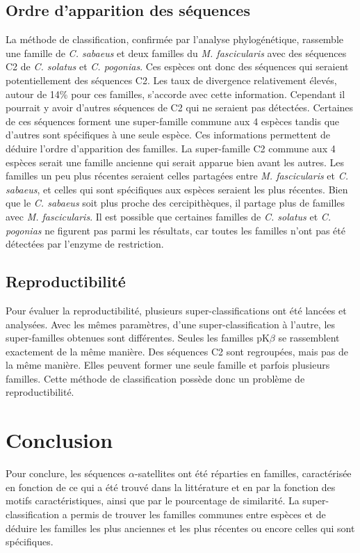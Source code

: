 \documentclass[12pt,a4paper]{article}
\begin{document}
	\subsection{Ordre d'apparition des séquences}
	La méthode de classification, confirmée par l'analyse phylogénétique, rassemble une famille de \textit{C. sabaeus} et deux familles du \textit{M. fascicularis} avec des séquences C2 de \textit{C. solatus} et \textit{C. pogonias}. Ces espèces ont donc des séquences qui seraient potentiellement des séquences C2. Les taux de divergence relativement élevés, autour de 14\% pour ces familles, s'accorde avec cette information. Cependant il pourrait y avoir d'autres séquences de C2 qui ne seraient pas détectées. Certaines de ces séquences forment une super-famille commune aux 4 espèces tandis que d'autres sont spécifiques à une seule espèce. Ces informations permettent de déduire l'ordre d'apparition des familles. La super-famille C2 commune aux 4 espèces serait une famille ancienne qui serait apparue bien avant les autres. Les familles un peu plus récentes seraient celles partagées entre \textit{M. fascicularis} et \textit{C. sabaeus}, et celles qui sont spécifiques aux espèces seraient les plus récentes. Bien que le \textit{C. sabaeus} soit plus proche des cercipithèques, il partage plus de familles avec \textit{M. fascicularis}. Il est possible que certaines familles de \textit{C. solatus} et \textit{C. pogonias} ne figurent pas parmi les résultats, car toutes les familles n'ont pas été détectées par l'enzyme de restriction. 
	\subsection{Reproductibilité}
	Pour évaluer la reproductibilité,  plusieurs super-classifications ont été lancées et analysées. Avec les mêmes paramètres, d'une super-classification à l'autre, les super-familles obtenues sont différentes. Seules les familles pK$\beta$ se rassemblent exactement de la même manière. Des séquences C2 sont regroupées, mais pas de la même manière. Elles peuvent former une seule famille et parfois plusieurs familles. Cette méthode de classification possède donc un problème de reproductibilité.  
	
\section{Conclusion}
	Pour conclure, les séquences  $\alpha$-satellites ont été réparties en familles, caractérisée en fonction de ce qui a été trouvé dans la littérature et en par la fonction des motifs caractéristiques, ainsi que par le pourcentage de similarité.  La super-classification a permis de trouver les familles communes entre espèces et de déduire les familles les plus anciennes et les plus récentes ou encore celles qui sont spécifiques.
	
\end{document}
